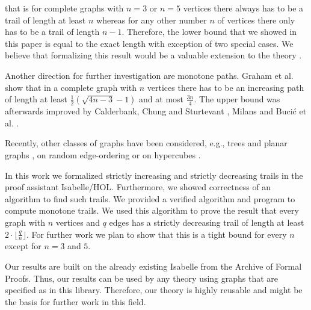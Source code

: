 \begin{isabellebody}
\begin{isamarkuptext}
that is for complete graphs with $n=3$ or $n=5$ vertices there always has to be a trail of length at least $n$ whereas 
for any other number $n$ of vertices there only has to be a trail of length $n - 1$. Therefore, the lower bound that
we showed in this paper is equal to the exact length with exception of two special cases.  
We believe that formalizing this result would be a valuable extension to the theory .

Another direction for further investigation are monotone paths. 
Graham et al. \cite{graham1973increasing} show that in a complete graph with $n$ vertices there has to be an increasing path of length 
at least $\frac{1}{2}(\sqrt{4n-3}-1)$ and at most $\frac{3n}{4}$. 
The upper bound was afterwards improved by Calderbank, Chung and Sturtevant \cite{calderbank1984increasing}, 
Milans \cite{milans2015monotone} and Buci{\'c} et al. \cite{bucic2018nearly}. 

Recently, other classes of graphs have been considered, e.g., trees and planar graphs \cite{roditty2001monotone},
on random edge-ordering \cite{yuster2001large} or on hypercubes \cite{de2015increasing}.%
\end{isamarkuptext}\isamarkuptrue%
%
\isadelimdocument
%
\endisadelimdocument
%
\isatagdocument
%
\isamarkuptrue%
%
\endisatagdocument
{\isafolddocument}%
%
\isadelimdocument
%
\endisadelimdocument
%
\begin{isamarkuptext}%
In this work we formalized strictly increasing and strictly decreasing trails in the proof assistant Isabelle/HOL. 
Furthermore, we showed correctness of an algorithm to find such trails. We provided a verified algorithm and program to compute monotone trails. 
We used this algorithm to
prove the result that every graph with $n$ vertices and $q$ edges has a strictly decreasing trail of length at least
$2\cdot\lfloor\frac{q}{n}\rfloor$. For further work we plan to show that this is a tight bound for every $n$ except for $n = 3$ and $5$. 

Our results are built on the already existing Isabelle  from the Archive of Formal Proofs. 
Thus, our results can be used by any theory using graphs that are specified as in this library.
Therefore, our theory is highly reusable and might be the basis for further work in this field.%
\end{isamarkuptext}\isamarkuptrue%
%
\isadelimtheory
%
\endisadelimtheory
%
\isatagtheory
%
\endisatagtheory
{\isafoldtheory}%
%
\isadelimtheory
%
\endisadelimtheory
%
\end{isabellebody}%
